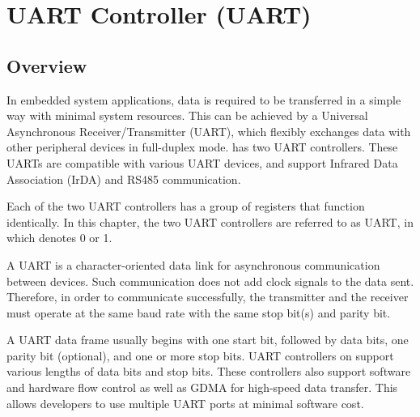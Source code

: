 \documentclass[main\_\_EN.tex]{subfiles}
\begin{document}

\ifglobal
\else
    {\let\clearpage\relax \listoftodos}
    {\let\clearpage\relax \listofdonetodos}
    \tableofcontents
\fi



\hypertarget{uart}{}
\chapter{UART Controller (UART)}
\label{mod:uart}

\section{Overview}

In embedded system applications, data is required to be transferred in a simple way with minimal system resources. This can be achieved by a Universal Asynchronous Receiver/Transmitter (UART), which flexibly exchanges data with other peripheral devices in full-duplex mode. \chipname{} has two UART controllers. These UARTs are compatible with various UART devices, and support Infrared Data Association (IrDA) and RS485 communication.

Each of the two UART controllers has a group of registers that function identically. In this chapter, the two UART controllers are referred to as UART, in which  denotes 0 or 1.

A UART is a character-oriented data link for asynchronous communication between devices. Such communication does not add clock signals to the data sent. Therefore, in order to communicate successfully, the transmitter and the receiver must operate at the same baud rate with the same stop bit(s) and parity bit.

A UART data frame usually begins with one start bit, followed by data bits, one parity bit (optional), and one or more stop bits. UART controllers on \chipname{} support various lengths of data bits and stop bits. These controllers also support software and hardware flow control as well as GDMA for high-speed data transfer. This allows developers to use multiple UART ports at minimal software cost.
\end{document}
